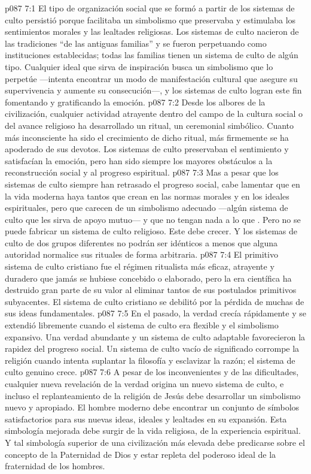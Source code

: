 \vs p087 7:1 El tipo de organización social que se formó a partir de los sistemas de culto persistió porque facilitaba un simbolismo que preservaba y estimulaba los sentimientos morales y las lealtades religiosas. Los sistemas de culto nacieron de las tradiciones “de las antiguas familias” y se fueron perpetuando como instituciones establecidas; todas las familias tienen un sistema de culto de algún tipo. Cualquier ideal que sirva de inspiración busca un simbolismo que lo perpetúe ---intenta encontrar un modo de manifestación cultural que asegure su supervivencia y aumente su consecución---, y los sistemas de culto logran este fin fomentando y gratificando la emoción.
\vs p087 7:2 Desde los albores de la civilización, cualquier actividad atrayente dentro del campo de la cultura social o del avance religioso ha desarrollado un ritual, un ceremonial simbólico. Cuanto más inconsciente ha sido el crecimiento de dicho ritual, más firmemente se ha apoderado de sus devotos. Los sistemas de culto preservaban el sentimiento y satisfacían la emoción, pero han sido siempre los mayores obstáculos a la reconstrucción social y al progreso espiritual.
\vs p087 7:3 Mas a pesar que los sistemas de culto siempre han retrasado el progreso social, cabe lamentar que en la vida moderna haya tantos que crean en las normas morales y en los ideales espirituales, pero que carecen de un simbolismo adecuado ---algún sistema de culto que les sirva de apoyo mutuo--- y que no tengan nada a lo que . Pero no se puede fabricar un sistema de culto religioso. Este debe crecer. Y los sistemas de culto de dos grupos diferentes no podrán ser idénticos a menos que alguna autoridad normalice sus rituales de forma arbitraria.
\vs p087 7:4 El primitivo sistema de culto cristiano fue el régimen ritualista más eficaz, atrayente y duradero que jamás se hubiese concebido o elaborado, pero la era científica ha destruido gran parte de su valor al eliminar tantos de sus postulados primitivos subyacentes. El sistema de culto cristiano se debilitó por la pérdida de muchas de sus ideas fundamentales.
\vs p087 7:5 \pc En el pasado, la verdad crecía rápidamente y se extendió libremente cuando el sistema de culto era flexible y el simbolismo expansivo. Una verdad abundante y un sistema de culto adaptable favorecieron la rapidez del progreso social. Un sistema de culto vacío de significado corrompe la religión cuando intenta suplantar la filosofía y esclavizar la razón; el sistema de culto genuino crece.
\vs p087 7:6 \pc A pesar de los inconvenientes y de las dificultades, cualquier nueva revelación de la verdad origina un nuevo sistema de culto, e incluso el replanteamiento de la religión de Jesús debe desarrollar un simbolismo nuevo y apropiado. El hombre moderno debe encontrar un conjunto de símbolos satisfactorios para sus nuevas ideas, ideales y lealtades en su expansión. Esta simbología mejorada debe surgir de la vida religiosa, de la experiencia espiritual. Y tal simbología superior de una civilización más elevada debe predicarse sobre el concepto de la Paternidad de Dios y estar repleta del poderoso ideal de la fraternidad de los hombres.
